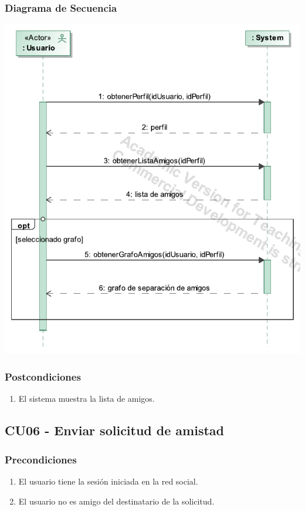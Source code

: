 \documentclass[12pt, a4paper, titlepage]{article}
\begin{document}
\subsubsection{Diagrama de Secuencia}
\begin{center}
	\includegraphics[width=\textwidth]{Imagenes/Ver_amigos}
\end{center}

\subsubsection{Postcondiciones}
\begin{enumerate}
	\item El sistema muestra la lista de amigos.
\end{enumerate}



\subsection{CU06 - Enviar solicitud de amistad}

\subsubsection{Precondiciones}
\begin{enumerate}
	\item El usuario tiene la sesión iniciada en la red social.
	\item El usuario no es amigo del destinatario de la solicitud.
\end{enumerate}
\end{document}

